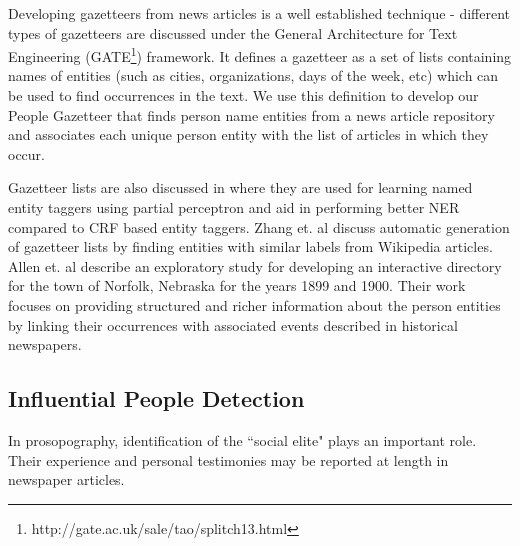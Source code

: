 Developing gazetteers from news articles is a well established technique - different types of gazetteers are discussed under the General Architecture for Text Engineering (GATE\footnote{http://gate.ac.uk/sale/tao/splitch13.html}) framework. It defines a gazetteer as a set of lists containing names of entities (such as cities, organizations, days of the week, etc) which can be used to find occurrences in the text. We use this definition to develop our People Gazetteer that finds person name entities from a news article repository and associates each unique person entity with the list of articles in which they occur.

Gazetteer lists are also discussed in \cite{carlson2009learning} where they are used for learning named entity taggers using partial perceptron and aid in performing better NER compared to CRF based entity taggers. Zhang et. al\cite{zhang2009novel} discuss automatic generation of gazetteer lists by finding entities with similar labels from Wikipedia articles. 
Allen et. al \cite{allen2013toward} describe an exploratory study for developing an interactive directory for the town of Norfolk, Nebraska for the years 1899 and 1900. Their work focuses on providing structured and richer information about the person entities by linking their occurrences with associated events described in historical newspapers. 

\subsection{Influential People Detection}
In prosopography, identification of the ``social elite" plays an important role. Their experience and personal testimonies may be reported at length in newspaper articles. 

